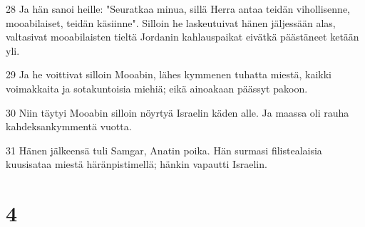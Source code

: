 \par 28 Ja hän sanoi heille: "Seuratkaa minua, sillä Herra antaa teidän vihollisenne, mooabilaiset, teidän käsiinne". Silloin he laskeutuivat hänen jäljessään alas, valtasivat mooabilaisten tieltä Jordanin kahlauspaikat eivätkä päästäneet ketään yli.
\par 29 Ja he voittivat silloin Mooabin, lähes kymmenen tuhatta miestä, kaikki voimakkaita ja sotakuntoisia miehiä; eikä ainoakaan päässyt pakoon.
\par 30 Niin täytyi Mooabin silloin nöyrtyä Israelin käden alle. Ja maassa oli rauha kahdeksankymmentä vuotta.
\par 31 Hänen jälkeensä tuli Samgar, Anatin poika. Hän surmasi filistealaisia kuusisataa miestä häränpistimellä; hänkin vapautti Israelin.

\chapter{4}

